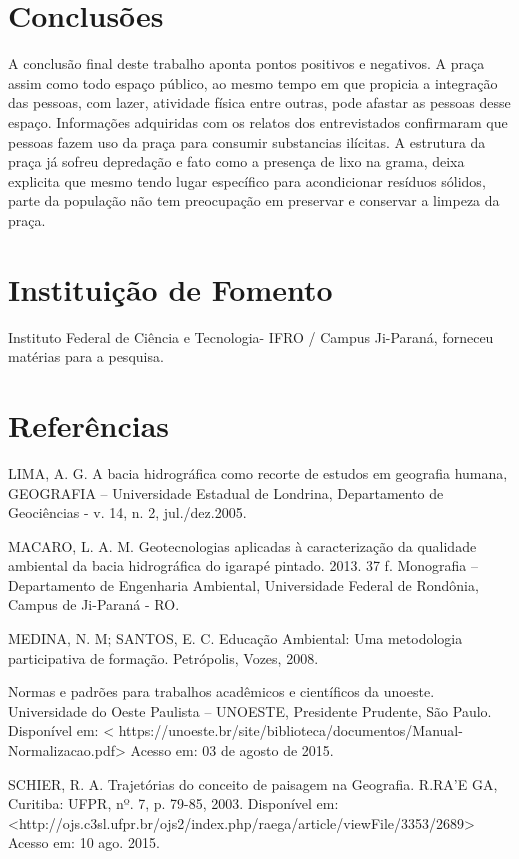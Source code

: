 \documentclass[article,12pt,onesidea,4paper,english,brazil]{abntex2}
\begin{document}
	\section*{Conclusões}
	
	A conclusão final deste trabalho aponta pontos positivos e negativos. A praça assim como todo espaço público, ao mesmo tempo em que propicia a integração das pessoas, com lazer, atividade física entre outras, pode afastar as pessoas desse espaço. Informações adquiridas com os relatos dos entrevistados confirmaram que pessoas fazem uso da praça para consumir substancias ilícitas. A estrutura da praça já sofreu depredação e fato como a presença de lixo na grama, deixa explicita que mesmo tendo lugar específico para acondicionar resíduos sólidos, parte da população não tem preocupação em preservar e conservar a limpeza da praça.
	
	\section*{Instituição de Fomento}
	
	Instituto Federal de Ciência e Tecnologia- IFRO / Campus Ji-Paraná, forneceu matérias para a pesquisa.
	
	\sloppy
	
	\section*{Referências}
	
	\noindent LIMA, A. G. A bacia hidrográfica como recorte de estudos em geografia humana, GEOGRAFIA – Universidade Estadual de Londrina, Departamento de Geociências - v. 14,  n. 2, jul./dez.2005.
	
	
	\noindent MACARO, L. A. M. Geotecnologias aplicadas à caracterização da qualidade ambiental da bacia hidrográfica do igarapé pintado. 2013. 37 f. Monografia – Departamento de Engenharia Ambiental, Universidade Federal de Rondônia, Campus de Ji-Paraná - RO.
	
	
	\noindent MEDINA, N. M; SANTOS, E. C. Educação Ambiental: Uma metodologia participativa de formação. Petrópolis, Vozes, 2008.
	
	
	\noindent Normas e padrões para trabalhos acadêmicos e científicos da unoeste. Universidade do Oeste Paulista – UNOESTE, Presidente Prudente, São Paulo. Disponível em: < https://unoeste.br/site/biblioteca/documentos/Manual-Normalizacao.pdf> Acesso em: 03 de agosto de 2015.
	
	
	\noindent SCHIER, R. A. Trajetórias do conceito de paisagem na Geografia. R.RA’E GA, Curitiba: UFPR,	nº.	7,	p.	79-85,	2003.	Disponível	em:
	<http://ojs.c3sl.ufpr.br/ojs2/index.php/raega/article/viewFile/3353/2689> Acesso em: 10 ago. 2015.
	
	
\end{document}
